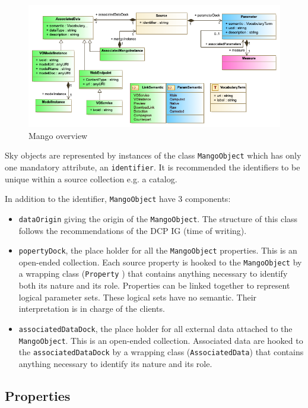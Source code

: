 \documentclass[11pt,a4paper]{ivoa}
\begin{document}
\begin{figure}
    \includegraphics[width=1.0\textwidth]{../model/mangoOverview.png}
    \caption{Mango overview} 
    \label{fig:overview}
\end{figure}

Sky objects are represented by instances of the class \texttt{MangoObject} which has only
one mandatory attribute, an \texttt{identifier}.
It is recommended the identifiers to be unique within a source collection e.g. a catalog.

In addition to the identifier, \texttt{MangoObject}  have 3 components:

\begin{itemize}
  \item \texttt{dataOrigin} giving the origin of the \texttt{MangoObject}. The structure of this class follows
        the recommendations of the DCP IG (time of writing).
  \item \texttt{popertyDock}, the place holder for all the \texttt{MangoObject} properties.
        This is an open-ended collection.
        Each source property is hooked to the \texttt{MangoObject} by a wrapping class (\texttt{Property} )
        that contains anything necessary to identify both its nature and its role.
        Properties can be linked together to represent logical parameter sets. 
        These logical sets have no semantic. Their interpretation is in charge of the clients.
  \item \texttt{associatedDataDock}, the place holder for all external data attached to the \texttt{MangoObject}.
        This is an open-ended collection.
  		Associated data are hooked to the \texttt{associatedDataDock} by a wrapping class (\texttt{AssociatedData})
        that contains anything necessary to identify its nature and its role.
\end{itemize}
\subsection{Properties}
\end{document}
